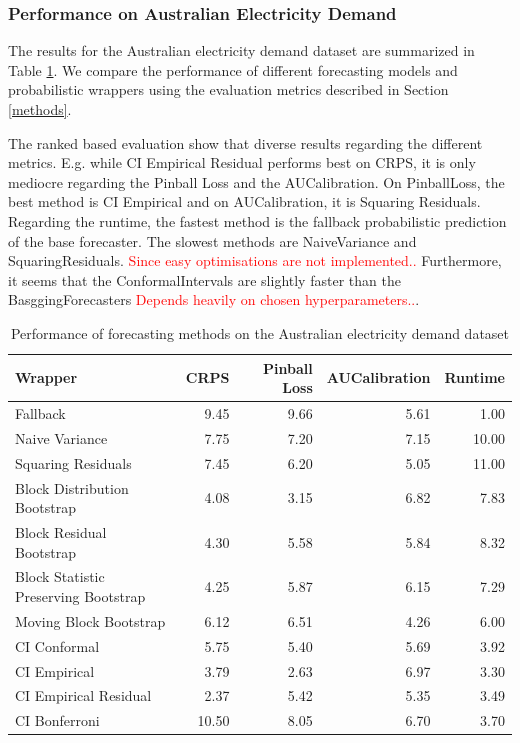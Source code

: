 \documentclass{article}
\begin{document}
\subsubsection{Performance on Australian Electricity Demand}
The results for the Australian electricity demand dataset are summarized in Table \ref{table:aus_elec_results}. We compare the performance of different forecasting models and probabilistic wrappers using the evaluation metrics described in Section \ref{methods}. 

The ranked based evaluation show that diverse results regarding the different metrics. E.g. while CI Empirical Residual performs best on CRPS, it is only mediocre regarding the Pinball Loss and the AUCalibration. On PinballLoss, the best method is CI Empirical and on AUCalibration, it is Squaring Residuals. Regarding the runtime, the fastest method is the fallback probabilistic prediction of the base forecaster. The slowest methods are NaiveVariance and SquaringResiduals. \textcolor{red}{Since easy optimisations are not implemented..} Furthermore, it seems that the ConformalIntervals are slightly faster than the BasggingForecasters \textcolor{red}{Depends heavily on chosen hyperparameters..}.

\begin{table}[h]
    \centering
    \caption{Performance of forecasting methods on the Australian electricity demand dataset}
    \label{table:aus_elec_results}
\begin{tabular}{lrrrr}
\toprule
Wrapper & CRPS & Pinball Loss & AUCalibration & Runtime \\
\midrule
Fallback & 9.45 & 9.66 & 5.61 & 1.00 \\
Naive Variance & 7.75 & 7.20 & 7.15 & 10.00 \\
Squaring Residuals & 7.45 & 6.20 & 5.05 & 11.00 \\
Block Distribution Bootstrap & 4.08 & 3.15 & 6.82 & 7.83 \\
Block Residual Bootstrap & 4.30 & 5.58 & 5.84 & 8.32 \\
Block Statistic Preserving Bootstrap & 4.25 & 5.87 & 6.15 & 7.29 \\
Moving Block Bootstrap & 6.12 & 6.51 & 4.26 & 6.00 \\
CI Conformal & 5.75 & 5.40 & 5.69 & 3.92 \\
CI Empirical & 3.79 & 2.63 & 6.97 & 3.30 \\
CI Empirical Residual & 2.37 & 5.42 & 5.35 & 3.49 \\
CI Bonferroni  & 10.50 & 8.05 & 6.70 & 3.70 \\
\bottomrule
\end{tabular}

\end{table}
\end{document}
